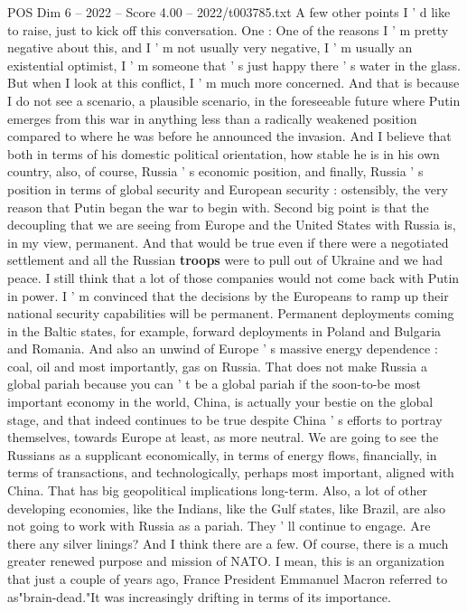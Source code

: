 \begin{textsample}{POS Dim 6 – 2022 – Score 4.00 – 2022/t003785.txt}
A few other points I ' d like to raise, just to kick off this conversation.
One : One of the reasons I ' m pretty negative about this, and I ' m not usually very negative, I ' m usually an existential optimist, I ' m someone that ' s just happy there ' s water in the glass.
But when I look at this conflict, I ' m much more concerned.
And that is because I do not see a scenario, a plausible scenario, in the foreseeable future where Putin emerges from this war in anything less than a radically weakened position compared to where he was before he announced the invasion.
And I believe that both in terms of his domestic political orientation, how stable he is in his own country, also, of course, Russia ' s economic position, and finally, Russia ' s position in terms of global security and European security : ostensibly, the very reason that Putin began the war to begin with.
Second big point is that the decoupling that we are seeing from Europe and the United States with Russia is, in my view, permanent.
And that would be true even if there were a negotiated settlement and all the Russian \textbf{troops} were to pull out of Ukraine and we had peace.
I still think that a lot of those companies would not come back with Putin in power.
I ' m convinced that the decisions by the Europeans to ramp up their national security capabilities will be permanent.
Permanent deployments coming in the Baltic states, for example, forward deployments in Poland and Bulgaria and Romania.
And also an unwind of Europe ' s massive energy dependence : coal, oil and most importantly, gas on Russia.
That does not make Russia a global pariah because you can ' t be a global pariah if the soon-to-be most important economy in the world, China, is actually your bestie on the global stage, and that indeed continues to be true despite China ' s efforts to portray themselves, towards Europe at least, as more neutral.
We are going to see the Russians as a supplicant economically, in terms of energy flows, financially, in terms of transactions, and technologically, perhaps most important, aligned with China.
That has big geopolitical implications long-term.
Also, a lot of other developing economies, like the Indians, like the Gulf states, like Brazil, are also not going to work with Russia as a pariah.
They ' ll continue to engage.
Are there any silver linings?
And I think there are a few.
Of course, there is a much greater renewed purpose and mission of NATO.
I mean, this is an organization that just a couple of years ago, France President Emmanuel Macron referred to as"brain-dead."It was increasingly drifting in terms of its importance.

\end{textsample}
